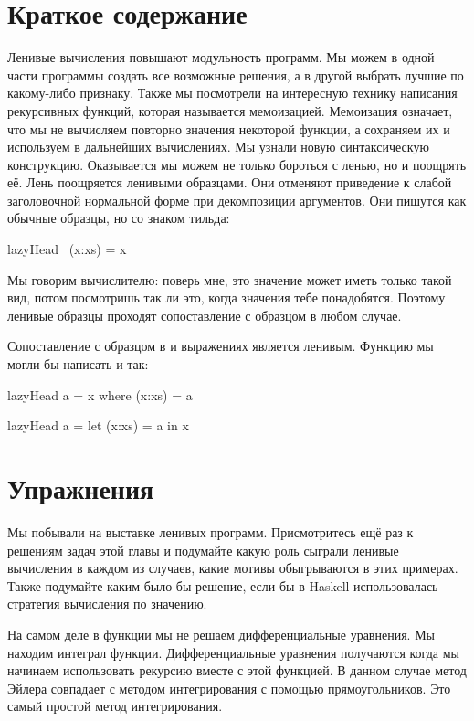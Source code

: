 \section{Краткое содержание}

Ленивые вычисления повышают модульность программ. 
Мы можем в одной части программы создать все возможные
решения, а в другой выбрать лучшие по какому-либо признаку.
Также мы посмотрели на интересную технику написания 
рекурсивных функций, которая называется мемоизацией. 
Мемоизация означает, что мы не вычисляем повторно значения 
некоторой функции, а сохраняем их и используем в дальнейших
вычислениях. 
Мы узнали новую синтаксическую конструкцию.
Оказывается мы можем не только бороться с ленью, но и поощрять её.
Лень поощряется ленивыми образцами. Они отменяют приведение
к слабой заголовочной нормальной форме при декомпозиции
аргументов. Они пишутся как обычные образцы, но со знаком тильда:

\begin{code}
lazyHead ~(x:xs) = x
\end{code}

Мы говорим вычислителю: поверь мне, это значение может иметь
только такой вид, потом посмотришь так ли это, когда
значения тебе понадобятся. Поэтому ленивые образцы проходят 
сопоставление с образцом в любом случае. 

Сопоставление с образцом в  и  
выражениях является ленивым. Функцию  
мы могли бы написать и так:

\begin{code}
lazyHead a = x
    where (x:xs) = a

lazyHead a = 
    let (x:xs) = a
    in  x
\end{code}


\section{Упражнения}

Мы побывали на выставке ленивых программ.
Присмотритесь ещё раз к решениям задач этой главы
и подумайте какую роль сыграли ленивые вычисления
в каждом из случаев, какие мотивы обыгрываются в этих примерах.
Также подумайте каким было бы решение, если бы в Haskell
использовалась стратегия вычисления по значению.

\item На самом деле в функции  мы не решаем 
    дифференциальные уравнения. Мы находим интеграл функции.
    Дифференциальные уравнения получаются когда мы 
    начинаем использовать рекурсию вместе с этой функцией.
    В данном случае метод Эйлера совпадает с методом
    интегрирования с помощью прямоугольников. 
    Это самый простой метод интегрирования.


